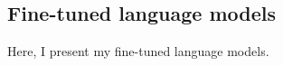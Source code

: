 \subsection{Fine-tuned language models}
\label{sub:finetuned_language_models}

Here, I present my fine-tuned language models.
